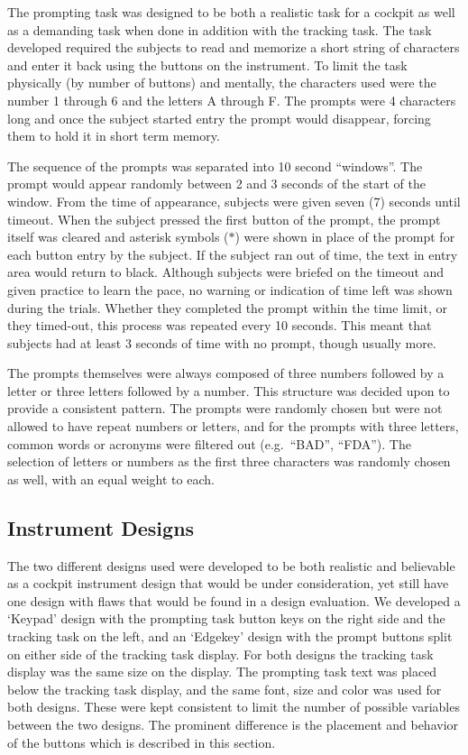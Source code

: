 The prompting task was designed to be both a realistic task for a cockpit as well as a demanding task when done in addition with the tracking task.
The task developed required the subjects to read and memorize a short string of characters and enter it back using the buttons on the instrument.
To limit the task physically (by number of buttons) and mentally, the characters used were the number 1 through 6 and the letters A through F.
The prompts were 4 characters long and once the subject started entry the prompt would disappear, forcing them to hold it in short term memory.

The sequence of the prompts was separated into 10 second ``windows''.
The prompt would appear randomly between 2 and 3 seconds of the start of the window.
From the time of appearance, subjects were given seven (7) seconds until timeout.
When the subject pressed the first button of the prompt, the prompt itself was cleared and asterisk symbols ($*$) were shown in place of the prompt for each button entry by the subject.
If the subject ran out of time, the text in entry area would return to black.
Although subjects were briefed on the timeout and given practice to learn the pace, no warning or indication of time left was shown during the trials.
Whether they completed the prompt within the time limit, or they timed-out, this process was repeated every 10 seconds.
This meant that subjects had at least 3 seconds of time with no prompt, though usually more.

The prompts themselves were always composed of three numbers followed by a letter or three letters followed by a number.
This structure was decided upon to provide a consistent pattern.
The prompts were randomly chosen but were not allowed to have repeat numbers or letters, and for the prompts with three letters, common words or acronyms were filtered out (e.g.\ ``BAD'', ``FDA'').
The selection of letters or numbers as the first three characters was randomly chosen as well, with an equal weight to each.

\subsection{Instrument Designs}

The two different designs used were developed to be both realistic and believable as a cockpit instrument design that would be under consideration, yet still have one design with flaws that would be found in a design evaluation.
We developed a `Keypad' design with the prompting task button keys on the right side and the tracking task on the left, and an `Edgekey' design with the prompt buttons split on either side of the tracking task display.
For both designs the tracking task display was the same size on the display.
The prompting task text was placed below the tracking task display, and the same font, size and color was used for both designs.
These were kept consistent to limit the number of possible variables between the two designs.
The prominent difference is the placement and behavior of the buttons which is described in this section.

